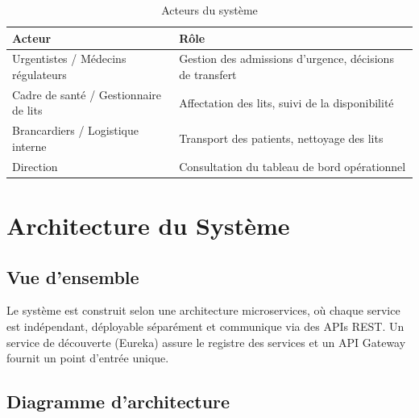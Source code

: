 \documentclass[12pt,a4paper]{report}
\begin{document}
\begin{table}[H]
    \centering
    \begin{tabularx}{\textwidth}{lX}
        \toprule
        \textbf{Acteur} & \textbf{R\^ole} \\
        \midrule
        Urgentistes / M\'edecins r\'egulateurs & Gestion des admissions d'urgence, d\'ecisions de transfert \\
        Cadre de sant\'e / Gestionnaire de lits & Affectation des lits, suivi de la disponibilit\'e \\
        Brancardiers / Logistique interne & Transport des patients, nettoyage des lits \\
        Direction & Consultation du tableau de bord op\'erationnel \\
        \bottomrule
    \end{tabularx}
    \caption{Acteurs du syst\`eme}
\end{table}

\chapter{Architecture du Syst\`eme}

\section{Vue d'ensemble}

Le syst\`eme est construit selon une architecture microservices, o\`u chaque service est ind\'ependant, d\'eployable s\'epar\'ement et communique via des APIs REST. Un service de d\'ecouverte (Eureka) assure le registre des services et un API Gateway fournit un point d'entr\'ee unique.

\section{Diagramme d'architecture}
\end{document}
